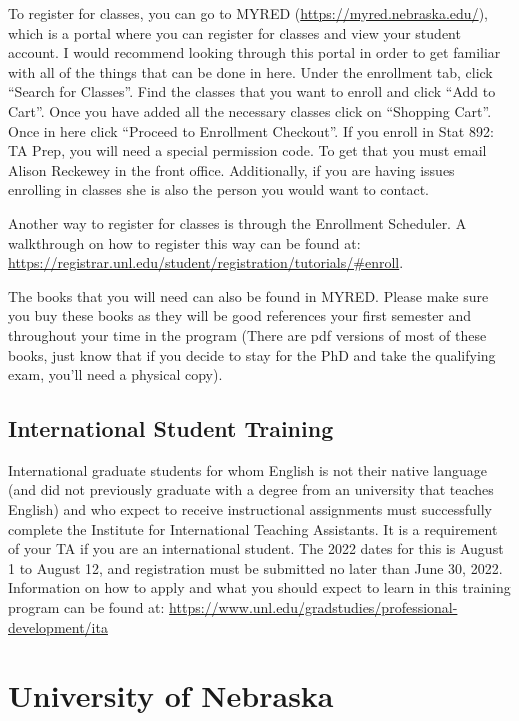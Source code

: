 \documentclass[
  12pt,
]{book}
\begin{document}
To register for classes, you can go to MYRED (\url{https://myred.nebraska.edu/}), which is a portal where you can register for classes and view your student account. I would recommend looking through this portal in order to get familiar with all of the things that can be done in here. Under the enrollment tab, click ``Search for Classes''. Find the classes that you want to enroll and click ``Add to Cart''. Once you have added all the necessary classes click on ``Shopping Cart''. Once in here click ``Proceed to Enrollment Checkout''. If you enroll in Stat 892: TA Prep, you will need a special permission code. To get that you must email Alison Reckewey in the front office. Additionally, if you are having issues enrolling in classes she is also the person you would want to contact.

Another way to register for classes is through the Enrollment Scheduler. A walkthrough on how to register this way can be found at: \url{https://registrar.unl.edu/student/registration/tutorials/\#enroll}.

The books that you will need can also be found in MYRED. Please make sure you buy these books as they will be good references your first semester and throughout your time in the program (There are pdf versions of most of these books, just know that if you decide to stay for the PhD and take the qualifying exam, you'll need a physical copy).

\hypertarget{international-student-training}{%
\section{International Student Training}\label{international-student-training}}

International graduate students for whom English is not their native language (and did not previously graduate with a degree from an university that teaches English) and who expect to receive instructional assignments must successfully complete the Institute for International Teaching Assistants. It is a requirement of your TA if you are an international student. The 2022 dates for this is August 1 to August 12, and registration must be submitted no later than June 30, 2022. Information on how to apply and what you should expect to learn in this training program can be found at: \url{https://www.unl.edu/gradstudies/professional-development/ita}

\hypertarget{unl}{%
\chapter{University of Nebraska}\label{unl}}
\end{document}
